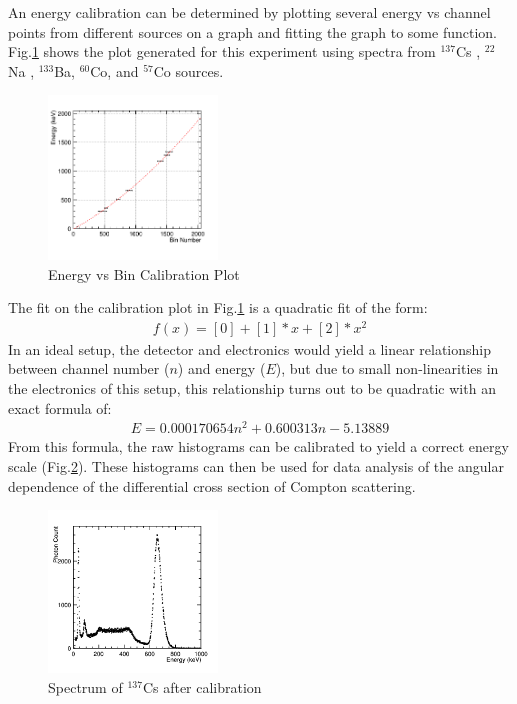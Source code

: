 \documentclass[%
 reprint,
 amsmath,amssymb,
 aps,
 pra,
]{revtex4-1}
\begin{document}
An energy calibration can be determined by plotting several energy vs channel points from different sources on a graph and fitting the graph to some function. Fig.\ref{Fig:EvBin} shows the plot generated for this experiment using spectra from $^{137}$Cs , $^{22}$Na , $^{133}$Ba, $^{60}$Co, and $^{57}$Co sources.

\begin{figure}[H]
\centering	
	\includegraphics[width=0.4\textwidth]{BinvEnergy.png}
	\caption{Energy vs Bin Calibration Plot}
	\label{Fig:EvBin}
\end{figure}

The fit on the calibration plot in Fig.\ref{Fig:EvBin} is a quadratic fit of the form:
\begin{gather}
f(x) = [0] + [1]*x + [2]*x^{2} \nonumber
\end{gather}
In an ideal setup, the detector and electronics would yield a linear relationship between channel number ($n$) and energy ($E$), but due to small non-linearities in the electronics of this setup, this relationship turns out to be quadratic with an exact formula of:
\begin{gather}
E = 0.000170654 n^2 + 0.600313 n - 5.13889 \nonumber
\end{gather}
From this formula, the raw histograms can be calibrated to yield a correct energy scale (Fig.\ref{Fig:CsCalib}). These histograms can then be used for data analysis of the angular dependence of the differential cross section of Compton scattering.
\begin{figure}[H]
\centering	
	\includegraphics[width=0.4\textwidth]{CsCalibFullSpec.png}
	\caption{Spectrum of $^{137}$Cs after calibration}
	\label{Fig:CsCalib}
\end{figure}
\end{document}
